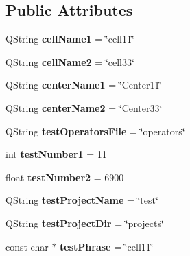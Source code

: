 \subsection*{Public Attributes}
\begin{DoxyCompactItemize}
\item 
Q\+String {\bfseries cell\+Name1} = \char`\"{}cell11\char`\"{}\hypertarget{class_cell_data___test_a86576f8a420db7fff54f3c0bd38e1940}{}\label{class_cell_data___test_a86576f8a420db7fff54f3c0bd38e1940}

\item 
Q\+String {\bfseries cell\+Name2} = \char`\"{}cell33\char`\"{}\hypertarget{class_cell_data___test_aabefe6fe19a4cc66b60cbc154aeb9192}{}\label{class_cell_data___test_aabefe6fe19a4cc66b60cbc154aeb9192}

\item 
Q\+String {\bfseries center\+Name1} = \char`\"{}Center11\char`\"{}\hypertarget{class_cell_data___test_a34e4a8f6576f453dd74b82fcd6b5b5b0}{}\label{class_cell_data___test_a34e4a8f6576f453dd74b82fcd6b5b5b0}

\item 
Q\+String {\bfseries center\+Name2} = \char`\"{}Center33\char`\"{}\hypertarget{class_cell_data___test_aa739f167cf2f061a81914f11b00336ba}{}\label{class_cell_data___test_aa739f167cf2f061a81914f11b00336ba}

\item 
Q\+String {\bfseries test\+Operators\+File} = \char`\"{}operators\char`\"{}\hypertarget{class_cell_data___test_ad719148dc874dfe5b34774a16727a65d}{}\label{class_cell_data___test_ad719148dc874dfe5b34774a16727a65d}

\item 
int {\bfseries test\+Number1} = 11\hypertarget{class_cell_data___test_a6b7490679330fed347ee065fc1f9d501}{}\label{class_cell_data___test_a6b7490679330fed347ee065fc1f9d501}

\item 
float {\bfseries test\+Number2} = 6900\hypertarget{class_cell_data___test_a60ec71bcced5a5010bb7face873cad3a}{}\label{class_cell_data___test_a60ec71bcced5a5010bb7face873cad3a}

\item 
Q\+String {\bfseries test\+Project\+Name} = \char`\"{}test\char`\"{}\hypertarget{class_cell_data___test_a3b7dcd0ebe102cc1694f5c9c29f8eddc}{}\label{class_cell_data___test_a3b7dcd0ebe102cc1694f5c9c29f8eddc}

\item 
Q\+String {\bfseries test\+Project\+Dir} = \char`\"{}projects\char`\"{}\hypertarget{class_cell_data___test_a295f782a4b9164b7e4561159729e3480}{}\label{class_cell_data___test_a295f782a4b9164b7e4561159729e3480}

\item 
const char $\ast$ {\bfseries test\+Phrase} = \char`\"{}cell11\char`\"{}\hypertarget{class_cell_data___test_a2c7d11cc027bdc26b7fec6a809989410}{}\label{class_cell_data___test_a2c7d11cc027bdc26b7fec6a809989410}

\end{DoxyCompactItemize}


